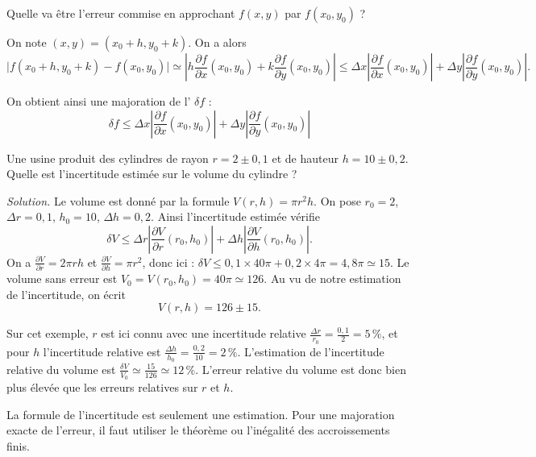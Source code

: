 \documentclass[11pt, class=report,crop=false]{standalone}
\begin{document}
Quelle va être l'erreur commise en approchant $f(x,y)$ par $f(x_0,y_0)$ ?



On note $(x,y) = (x_0+h,y_0+k)$. On a alors
$$
  \big| f(x_0+h,y_0+k) - f(x_0,y_0) \big| 
   \simeq \left| h\frac{\partial f}{\partial x}(x_0,y_0)
+k\frac{\partial f}{\partial y}(x_0,y_0) \right| 
   \le \Delta x \left|\frac{\partial f}{\partial x}(x_0,y_0) \right| 
+ \Delta y \left|\frac{\partial f}{\partial y}(x_0,y_0) \right| .
$$


On obtient ainsi une majoration de l' $\delta f$ :
$$\delta f \le \Delta x \left|\frac{\partial f}{\partial x}(x_0,y_0) \right| 
+ \Delta y \left|\frac{\partial f}{\partial y}(x_0,y_0) \right|$$


\begin{exemple}
Une usine produit des cylindres de rayon $r = 2 \pm 0,1$ et de hauteur $h = 10 \pm 0,2$. Quelle est l'incertitude estimée sur le volume du cylindre ?

\bigskip

\emph{Solution.}
Le volume est donné par la formule $V(r,h) = \pi r^2 h$.
On pose $r_0 = 2$, $\Delta r = 0,1$, $h_0 = 10$, $\Delta h = 0,2$.
Ainsi l'incertitude estimée vérifie
$$\delta V \le \Delta r\left|\frac{\partial V}{\partial r}(r_0,h_0) \right| + \Delta h\left|\frac{\partial V}{\partial h} (r_0,h_0)\right| .$$
On a 
$\frac{\partial V}{\partial r} = 2\pi r h$ 
et $\frac{\partial V}{\partial h} = \pi r^2$, donc ici :
$\delta V \le 0,1 \times 40\pi + 0,2 \times 4 \pi = 4,8\pi \simeq 15$.   
Le volume sans erreur est $V_0 = V(r_0,h_0) = 40 \pi \simeq 126$.
Au vu de notre estimation de l'incertitude, on écrit 
$$V(r,h) = 126 \pm 15.$$

\end{exemple}

\begin{remarque*}
Sur cet exemple, $r$ est ici connu avec une incertitude relative 
$\frac{\Delta r}{r_0} = \frac{0,1}{2} = 5\,\%$, et pour 
$h$ l'incertitude relative est $\frac{\Delta h}{h_0} = \frac{0,2}{10} = 2\,\%$.
L'estimation de l'incertitude relative du volume est 
$\frac{\delta V}{V_0} \simeq  \frac{15}{126} \simeq 12 \,\%$.
L'erreur relative du volume est donc bien plus élevée que les erreurs relatives sur $r$ et $h$.
\end{remarque*}

\begin{remarque*}
La formule de l'incertitude est seulement une estimation.
Pour une majoration exacte de l'erreur, il faut utiliser le théorème ou l'inégalité des accroissements finis.
\end{remarque*}
\end{document}
